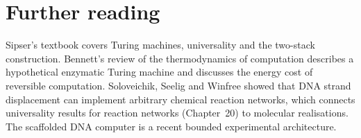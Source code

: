 \section*{Further reading}
Sipser's textbook covers Turing machines, universality and the two-stack
construction.\cite{Sipser2013} Bennett's review of the thermodynamics of
computation describes a hypothetical enzymatic Turing machine and discusses
the energy cost of reversible computation.\cite{Bennett1982} Soloveichik,
Seelig and Winfree showed that DNA strand displacement can implement arbitrary
chemical reaction networks,\cite{Soloveichik2010} which connects universality
results for reaction networks (Chapter~20) to molecular realisations. The
scaffolded DNA computer is a recent bounded experimental
architecture.\cite{Sterin2026}
